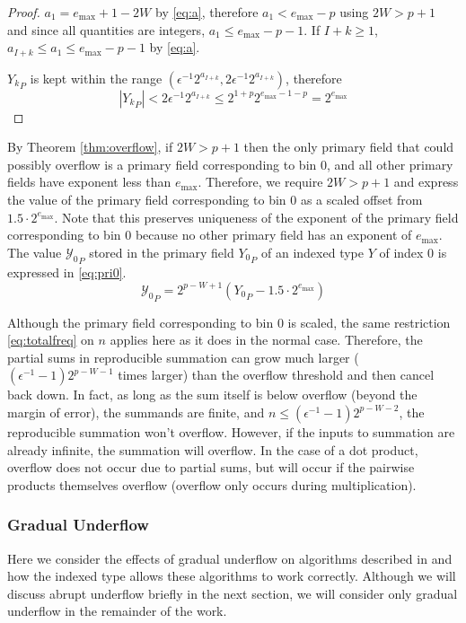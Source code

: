       \begin{proof}
        $a_1 = e_{\max} + 1 - 2 W$ by \eqref{eq:a}, therefore $a_1 < e_{\max} - p$ using $2W > p+1$ and since all quantities are integers, $a_1 \leq e_{\max} - p - 1$. If $I + k \geq 1$, $a_{I + k} \leq a_1 \leq e_{\max} - p - 1$ by \eqref{eq:a}.

        ${Y_k}_P$ is kept within the range $(\epsilon^{-1} 2^{a_{I + k}}, 2 \epsilon^{-1} 2^{a_{I + k}})$, therefore
        \begin{equation*}
          |{Y_k}_P| < 2 \epsilon^{-1} 2^{a_{I + k}} \leq 2^{1 + p} 2^{e_{\max} - 1 - p} = 2^{e_{\max}}
        \end{equation*}
      \end{proof}
      By Theorem \ref{thm:overflow}, if $2 W > p + 1$ then the only primary
      field that could possibly overflow is a primary field corresponding to
      bin 0, and all other primary fields have exponent less than $e_{\max}$.
      Therefore, we require $2 W > p + 1$ and express the value of the primary
      field corresponding to bin 0 as a scaled offset from
      $1.5\cdot2^{e_{\max}}$. Note that this preserves uniqueness of the
      exponent of the primary field corresponding to bin 0 because no other
      primary field has an exponent of $e_{\max}$. The value
      ${\mathcal{Y}_0}_P$ stored in the primary field ${Y_0}_P$ of an indexed
      type $Y$ of index 0 is expressed in \eqref{eq:pri0}.
      \begin{equation}
        {\mathcal{Y}_0}_P = 2^{p - W + 1}({Y_0}_P - 1.5\cdot2^{e_{\max}})
        \label{eq:pri0}
      \end{equation}

      Although the primary field corresponding to bin 0 is scaled, the same restriction \eqref{eq:totalfreq} on $n$ applies here as it does in the normal case. Therefore, the partial sums in reproducible summation can grow much larger ($(\epsilon^{-1} - 1)2^{p - W - 1}$ times larger) than the overflow threshold and then cancel back down. In fact, as long as the sum itself is below overflow (beyond the margin of error), the summands are finite, and $n \leq (\epsilon^{-1} - 1)2^{p - W - 2}$, the reproducible summation won't overflow. However, if the inputs to summation are already infinite, the summation will overflow. In the case of a dot product, overflow does not occur due to partial sums, but will occur if the pairwise products themselves overflow (overflow only occurs during multiplication).

    \subsubsection{Gradual Underflow}
      \label{sec:indexed_underflow_gradual}
      Here we consider the effects of gradual underflow on algorithms described
      in \cite{repsum} and how the indexed type allows these algorithms to work
      correctly. Although we will discuss abrupt underflow briefly in the next section, we will consider only gradual underflow in the remainder of the work.

